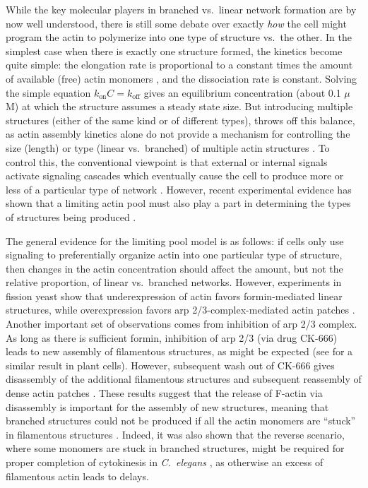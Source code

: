 \documentclass[11pt]{article}
\begin{document}
While the key molecular players in branched vs.\ linear network formation are by now well understood, there is still some debate over exactly \emph{how} the cell might program the actin to polymerize into one type of structure vs.\ the other. In the simplest case when there is exactly one structure formed, the kinetics become quite simple: the elongation rate is proportional to a constant times the amount of available (free) actin monomers \cite{suarez2016internetwork}, and the dissociation rate is constant. Solving the simple equation $k_\text{on} C=k_\text{off}$ gives an equilibrium concentration (about 0.1 $\mu$M) at which the structure assumes a steady state size. But introducing multiple structures (either of the same kind or of different types), throws off this balance, as actin assembly kinetics alone do not provide a mechanism for controlling the size (length) or type (linear vs.\ branched) of multiple actin structures \cite{mohapatra2017limiting}. To control this, the conventional viewpoint is that external or internal signals \cite{carlier2017global} activate signaling cascades which eventually cause the cell to produce more or less of a particular type of network \cite{martin2005tea4p, pollard2007regulation, suarez2016internetwork}. However, recent experimental evidence has shown that a limiting actin pool must also play a part in determining the types of structures being produced \cite{burke2014homeostatic}. 

The general evidence for the limiting pool model is as follows: if cells only use signaling to preferentially organize actin into one particular type of structure, then changes in the actin concentration should affect the amount, but not the relative proportion, of linear vs.\ branched networks. However, experiments in fission yeast show that underexpression of actin favors formin-mediated linear structures, while overexpression favors arp 2/3-complex-mediated actin patches \cite{burke2014homeostatic}. Another important set of observations comes from inhibition of arp 2/3 complex. As long as there is sufficient formin, inhibition of arp 2/3 (via drug CK-666) leads to new assembly of filamentous structures, as might be expected (see \cite{xu2023cooperative} for a similar result in plant cells). However, subsequent wash out of CK-666 gives disassembly of the additional filamentous structures and subsequent reassembly of dense actin patches \cite{burke2014homeostatic}. These results suggest that the release of F-actin via disassembly is important for the assembly of new structures, meaning that branched structures could not be produced if all the actin monomers are ``stuck'' in filamentous structures \cite{suarez2016internetwork}. Indeed, it was also shown that the reverse scenario, where some monomers are stuck in branched structures, might be required for proper completion of cytokinesis in \emph{C.\ elegans} \cite{chan2019arp2}, as otherwise an excess of filamentous actin leads to delays.
\end{document}
